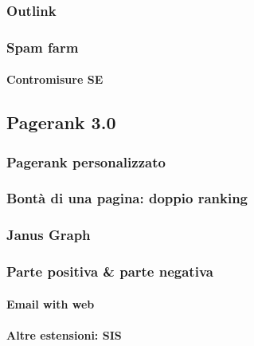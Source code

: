 			\subsubsection{Outlink}
			
			\subsubsection{Spam farm}
				
				\paragraph{Contromisure SE}
			
		\subsection{Pagerank 3.0}
		
			\subsubsection{Pagerank personalizzato}
			
			\subsubsection{Bontà di una pagina: doppio ranking}
			
			\subsubsection{Janus Graph}
			
			\subsubsection{Parte positiva \& parte negativa}
			
				\paragraph{Email with web}
				
				\paragraph{Altre estensioni: SIS}